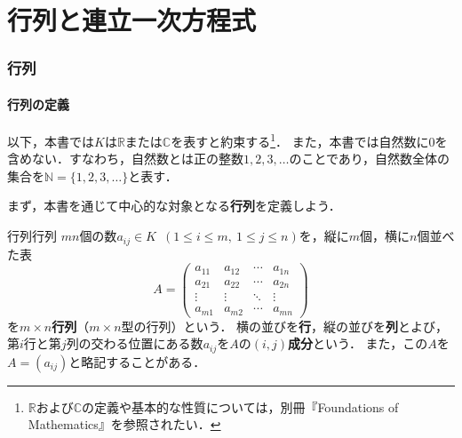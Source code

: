 \part{行列と連立一次方程式}

\begin{abstract}
  線型代数の出発点となる\textbf{行列}を定義し，和・スカラー倍・積などの演算とその性質を整理する．
  さらに，連立一次方程式を行列を用いて表し，行基本変形による解法を学ぶ．
  解が無数に存在する場合の一般解の表し方と，掃き出し法による逆行列の計算もあわせて扱う．
\end{abstract}

\section{行列}

\subsection{行列の定義}

以下，本書では$K$は$\mathbb{R}$または$\mathbb{C}$を表すと約束する\footnote{$\mathbb{R}$および$\mathbb{C}$の定義や基本的な性質については，別冊『Foundations of Mathematics』を参照されたい．}．
また，本書では自然数に$0$を含めない．すなわち，自然数とは正の整数$1, 2, 3, \dots$のことであり，自然数全体の集合を$\mathbb{N} = \{1, 2, 3, \dots\}$と表す．

まず，本書を通じて中心的な対象となる\textbf{行列}を定義しよう．

\begin{definition}{行列}{行列}
  $mn$個の数$a_{ij} \in K$~$(1 \le i \le m,~1 \le j \le n)$を，縦に$m$個，横に$n$個並べた表
  \[
    A =
    \begin{pmatrix}
      a_{11} & a_{12} & \cdots & a_{1n} \\
      a_{21} & a_{22} & \cdots & a_{2n} \\
      \vdots & \vdots & \ddots & \vdots \\
      a_{m1} & a_{m2} & \cdots & a_{mn}
    \end{pmatrix}
  \]
  を\textbf{$m \times n$行列}（$m \times n$型の行列）という．
  横の並びを\textbf{行}，縦の並びを\textbf{列}とよび，第$i$行と第$j$列の交わる位置にある数$a_{ij}$を$A$の\textbf{$(i, j)$成分}という．
  また，この$A$を$A = (a_{ij})$と略記することがある．
\end{definition}

